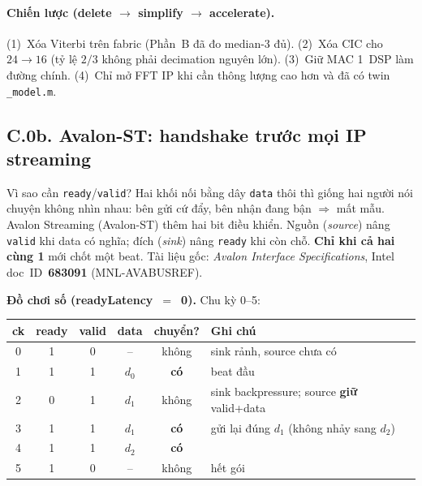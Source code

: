 \paragraph{Chiến lược (delete $\to$ simplify $\to$ accelerate).}
(1)~Xóa Viterbi trên fabric (Phần~B đã đo median-3 đủ). (2)~Xóa CIC cho $24\to16$ (tỷ lệ $2/3$ không phải decimation nguyên lớn). (3)~Giữ MAC 1~DSP làm đường chính. (4)~Chỉ mở FFT IP khi cần thông lượng cao hơn và đã có twin \texttt{\_model.m}.

\subsection*{C.0b. Avalon-ST: handshake trước mọi IP streaming}

\begin{firstprin}{Vì sao cần \texttt{ready}/\texttt{valid}?}
Hai khối nối bằng dây \texttt{data} thôi thì giống hai người nói chuyện không nhìn nhau: bên gửi cứ đẩy, bên nhận đang bận $\Rightarrow$ mất mẫu. Avalon Streaming (Avalon-ST) thêm hai bit điều khiển. Nguồn (\emph{source}) nâng \texttt{valid} khi data có nghĩa; đích (\emph{sink}) nâng \texttt{ready} khi còn chỗ. \textbf{Chỉ khi cả hai cùng 1} mới chốt một beat. Tài liệu gốc: \emph{Avalon Interface Specifications}, Intel doc~ID~\textbf{683091} (MNL-AVABUSREF).
\end{firstprin}

\noindent\textbf{Đồ chơi số (readyLatency~$=$~0).} Chu kỳ 0--5:

\begin{center}
\small
\begin{tabular}{@{}cccccl@{}}
\toprule
ck & ready & valid & data & chuyển? & Ghi chú \\
\midrule
0 & 1 & 0 & -- & không & sink rảnh, source chưa có \\
1 & 1 & 1 & $d_0$ & \textbf{có} & beat đầu \\
2 & 0 & 1 & $d_1$ & không & sink backpressure; source \textbf{giữ} valid+data \\
3 & 1 & 1 & $d_1$ & \textbf{có} & gửi lại đúng $d_1$ (không nhảy sang $d_2$) \\
4 & 1 & 1 & $d_2$ & \textbf{có} & \\
5 & 1 & 0 & -- & không & hết gói \\
\bottomrule
\end{tabular}
\end{center}

